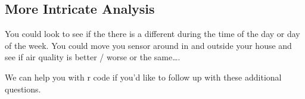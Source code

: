 \documentclass{article}\usepackage[]{graphicx}\usepackage[]{color}
\begin{document}
\subsection{More Intricate Analysis}

You could look to see if the there is a different during the time of the day or day of the week. You could move you sensor around in and outside your house and see if air quality is better / worse or the same\ldots.

We can help you with r code if you'd like to follow up with these additional questions. 
\end{document}
